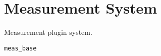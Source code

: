 \section{Measurement System}
\label{sec:meas}

Measurement plugin system.

\texttt{meas\_base}














